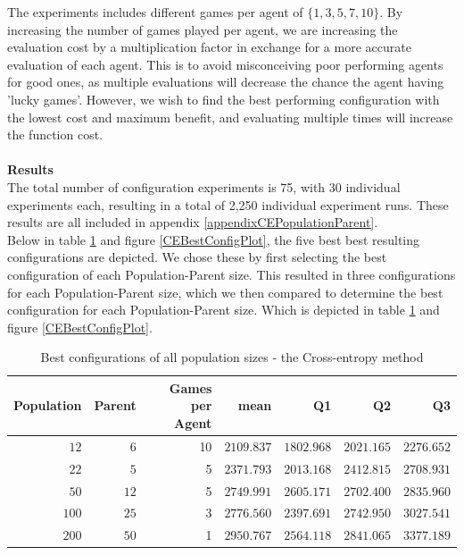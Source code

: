 The experiments includes different games per agent of $\{1,3,5,7,10\}$. By increasing the number of games 
played per agent, we are increasing the evaluation cost by a multiplication factor in exchange for a more 
accurate evaluation of each agent. This is to avoid misconceiving poor performing agents
for good ones, as multiple evaluations will decrease the chance the agent having 
'lucky games'. However, we wish to find 
the best performing configuration with the lowest cost and maximum benefit, and evaluating multiple 
times will increase the function cost.\\
\\
\textbf{Results}\\
The total number of configuration experiments is 75, with 30 individual experiments each,
resulting in a total of
2,250
individual experiment runs. These results are all included in 
appendix \ref{appendixCEPopulationParent}.\\
Below in table \ref{CEBestConfigTable} and figure \ref{CEBestConfigPlot}, the five best
best resulting configurations are depicted. We chose these by first selecting the best 
configuration of each Population-Parent size. This resulted in three
configurations for each Population-Parent size, which we then compared to determine the best
configuration for each Population-Parent size. Which is depicted in table \ref{CEBestConfigTable} and figure \ref{CEBestConfigPlot}.
\begin{table}[H]
\centering
\small
\begin{tabular}{r r r r r r r}
Population & Parent & Games per Agent & mean & Q1 & Q2 & Q3\\
\hline
$12$ & $6$ & 10 & $2109.837$ & $1802.968$ & $2021.165$ & $2276.652$\\
$22$ & $5$ & 5 & $2371.793$ & $2013.168$ & $2412.815$ & $2708.931$\\
$50$ & $12$ & 5 & $2749.991$ & $2605.171$ & $2702.400$ & $2835.960$\\
$100$ & $25$ & 3 & $2776.560$ & $2397.691$ & $2742.950$ & $3027.541$\\
$200$ & $50$ & 1 & $2950.767$ & $2564.118$ & $2841.065$ & $3377.189$\\
\end{tabular}
\caption{Best configurations of all population sizes - the Cross-entropy method \label{CEBestConfigTable}}
\end{table}

